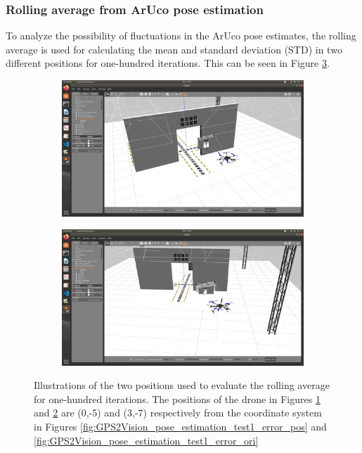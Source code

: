 \documentclass[../Head/report.tex]{subfiles}
\begin{document}
\subsubsection{Rolling average from ArUco pose estimation}
\label{sec:rolling_average_aruco_pose_estimation}

To analyze the possibility of fluctuations in the ArUco pose estimates, the rolling average is used for calculating the mean and standard deviation (STD) in two different positions for one-hundred iterations. This can be seen in Figure \ref{fig:rolling_average_pos}. 

\begin{figure}[H]
    \centering
    \begin{subfigure}[t]{.30\textwidth}
        \centering
        \includegraphics[width=\textwidth]{../Figures/analyse_rolling_average/optimal_pose.png}
        \caption{}
        \label{fig:rolling_average_good_pos}
    \end{subfigure}
    \hspace{0.5em}
    \begin{subfigure}[t]{.30\textwidth}
        \centering
        \includegraphics[width=\textwidth]{../Figures/analyse_rolling_average/bad_pose.png}
        \caption{}
        \label{fig:rolling_average_bad_pos}
    \end{subfigure}
    \caption{Illustrations of the two positions used to evaluate the rolling average for one-hundred iterations. The positions of the drone in Figures \ref{fig:rolling_average_good_pos} and \ref{fig:rolling_average_bad_pos} are (0,-5) and (3,-7) respectively from the coordinate system in Figures \ref{fig:GPS2Vision_pose_estimation_test1_error_pos} and \ref{fig:GPS2Vision_pose_estimation_test1_error_ori}} 
    \label{fig:rolling_average_pos}
\end{figure}
\end{document}
